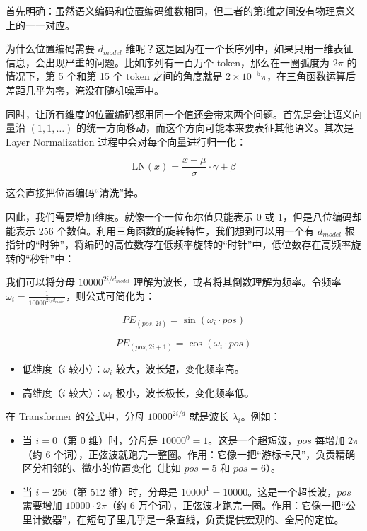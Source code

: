 首先明确：虽然语义编码和位置编码维数相同，但二者的第i维之间没有物理意义上的一一对应。

为什么位置编码需要 \(d_{model}\) 维呢？这是因为在一个长序列中，如果只用一维表征信息，会出现严重的问题。比如序列有一百万个 token，那么在一圈弧度为 \(2\pi\) 的情况下，第 5 个和第 15 个 token 之间的角度就是 \(2 \times 10^{-5}\pi\)，在三角函数运算后差距几乎为零，淹没在随机噪声中。

同时，让所有维度的位置编码都用同一个值还会带来两个问题。首先是会让语义向量沿 \((1,1,\ldots)\) 的统一方向移动，而这个方向可能本来要表征其他语义。其次是 Layer Normalization 过程中会对每个向量进行归一化：

\[
\mathrm{LN}(x)=\frac{x-\mu}{\sigma}\cdot\gamma+\beta
\]

这会直接把位置编码``清洗''掉。

因此，我们需要增加维度。就像一个一位布尔值只能表示 0 或 1，但是八位编码却能表示 256 个数值。利用三角函数的旋转特性，我们想到可以用一个有 \(d_{model}\) 根指针的``时钟''，将编码的高位数存在低频率旋转的``时针''中，低位数存在高频率旋转的``秒针''中：

我们可以将分母 \(10000^{2i/d_{model}}\) 理解为波长，或者将其倒数理解为频率。令频率 \(\omega_i=\frac{1}{10000^{2i/d_{model}}}\)，则公式可简化为：

\[
PE_{(pos,2i)}=\sin(\omega_i\cdot pos)
\]

\[
PE_{(pos,2i+1)}=\cos(\omega_i\cdot pos)
\]

\begin{itemize}
\tightlist
\item
  低维度（\(i\) 较小）：\(\omega_i\) 较大，波长短，变化频率高。
\item
  高维度（\(i\) 较大）：\(\omega_i\) 极小，波长极长，变化频率低。
\end{itemize}

在 Transformer 的公式中，分母 \(10000^{2i/d}\) 就是波长 \(\lambda_i\)。例如：

\begin{itemize}
\tightlist
\item
  当 \(i=0\)（第 0 维）时，分母是 \(10000^0=1\)。这是一个超短波，\(pos\) 每增加 \(2\pi\)（约 6 个词），正弦波就跑完一整圈。作用：它像一把``游标卡尺''，负责精确区分相邻的、微小的位置变化（比如 \(pos=5\) 和 \(pos=6\)）。
\item
  当 \(i=256\)（第 512 维）时，分母是 \(10000^1=10000\)。这是一个超长波，\(pos\) 需要增加 \(10000\cdot2\pi\)（约 6 万个词），正弦波才跑完一圈。作用：它像一把``公里计数器''，在短句子里几乎是一条直线，负责提供宏观的、全局的定位。
\end{itemize}

